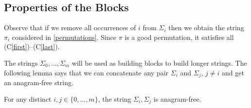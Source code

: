 \documentclass[kpfonts]{patmorin}
\newcommand{\condref}[1]{(C\ref{#1})}
\begin{document}
\subsection{Properties of the Blocks}

Observe that if we remove all occurrences of $i$ from $\Sigma_i$ then we obtain the string $\pi_i$ considered in \cref{permutations}.  Since $\pi$ is a good permutation, it satisfies all \condref{first}--\condref{last}.

The strings $\Sigma_0,\ldots,\Sigma_m$ will be used as building blocks to build longer strings.  The following lemma says that we can concatenate any pair $\Sigma_i$ and $\Sigma_j$, $j\neq i$ and get an anagram-free string.

\begin{lem}\label{pairs_anagram}
    For any distinct $i,j\in\{0,\ldots,m\}$, the string $\Sigma_i,\Sigma_j$ is anagram-free.
\end{lem}
\end{document}
